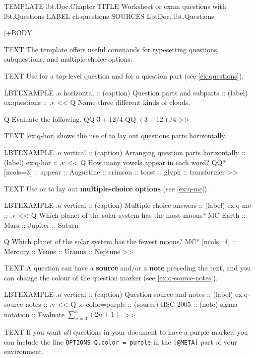 
\begin{lbt}
  [@META]
    TEMPLATE  lbt.Doc.Chapter
    TITLE     Worksheet or exam questions with lbt.Questions
    LABEL     ch.questions
    SOURCES   LbtDoc, lbt.Questions

  [+BODY]

    TEXT The  template offers useful commands for typesetting questions, subquestions, and multiple-choice options.

    TEXT Use  for a top-level question and  for a question part (see \vref{ex:questions}).

    LBTEXAMPLE .o horizontal
    :: (caption) Question parts and subparts
    :: (label) ex:questions
    :: .v <<
      Q Name three different kinds of clouds.

      Q Evaluate the following.
      QQ $3 + 12 / 4$
      QQ $(3 + 12) / 4$
    >>

    TEXT \vref{ex:q-hor} shows the use of  to lay out questions parts horizontally.

    LBTEXAMPLE .o vertical
    :: (caption) Arranging question parts horizontally
    :: (label) ex:q-hor
    :: .v <<
      Q How many vowels appear in each word?
      QQ* [ncols=3]
      :: appear :: Augustine :: crimson :: toast :: glyph :: transformer
    >>

    TEXT Use  or  to lay out \textbf{multiple-choice options} (see \vref{ex:q-mc}).

    LBTEXAMPLE .o vertical
    :: (caption) Multiple choice answers
    :: (label) ex:q-mc
    :: .v <<
      Q Which planet of the solar system has the most moons?
      MC Earth :: Mars :: Jupiter :: Saturn

      Q Which planet of the solar system has the fewest moons?
      MC* [ncols=4] :: Mercury :: Venus :: Uranus :: Neptune
    >>

    TEXT A question can have a \textbf{source} and/or a \textbf{note} preceding the text, and you can change the colour of the question marker (see \vref{ex:q-source-notes}).

    LBTEXAMPLE .o vertical
    :: (caption) Question source and notes
    :: (label) ex:q-source-notes
    :: .v <<
      Q .o color=purple :: (source) HSC 2005 :: (note) sigma notation
      :: Evaluate $\displaystyle \sum_{n=3}^5 (2n+1)$.
    >>

    TEXT If you want \emph{all} questions in your document to have a purple marker, you can include the line \texttt{OPTIONS  Q.color = purple} in the \texttt{[@META]} part of your \lbtlogo{} environment.

\end{lbt}
